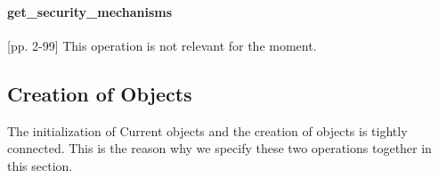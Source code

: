 \paragraph{get\_security\_mechanisms}
[pp. 2-99] This operation is not relevant for the moment.



\subsection{Creation of Objects} \label{sec:creation}
The initialization of Current objects and the creation of objects is tightly
connected.  This is the reason why we specify these two operations together in
this section.


